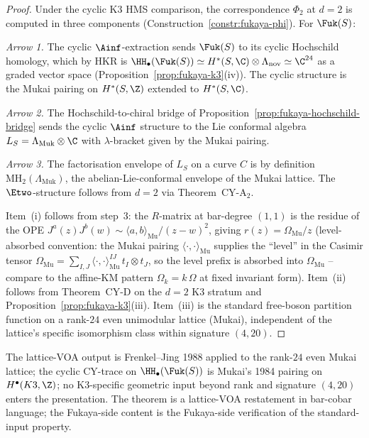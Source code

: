 \begin{proof}
Under the cyclic K3 HMS comparison, the correspondence $\Phi_2$ at
$d = 2$ is computed in three components
(Construction~\ref{constr:fukaya-phi}). For $\Fuk(S)$:

\emph{Arrow 1.} The cyclic $\Ainf$-extraction sends $\Fuk(S)$ to
its cyclic Hochschild homology, which by HKR is
$\HH_\bullet(\Fuk(S)) \simeq H^*(S, \C) \otimes
\Lambda_{\mathrm{nov}} \simeq \C^{24}$ as a graded vector space
(Proposition~\ref{prop:fukaya-k3}(iv)). The cyclic structure is
the Mukai pairing on $H^*(S, \Z)$ extended to $H^*(S, \C)$.

\emph{Arrow 2.} The Hochschild-to-chiral bridge of
Proposition~\ref{prop:fukaya-hochschild-bridge} sends the cyclic
$\Ainf$ structure to the Lie conformal algebra
$L_S = \Lambda_{\mathrm{Muk}} \otimes \C$ with $\lambda$-bracket given by
the Mukai pairing.

\emph{Arrow 3.} The factorisation envelope of $L_S$ on a curve $C$
is by definition $\mathrm{MH}_2(\Lambda_{\mathrm{Muk}})$, the
abelian-Lie-conformal envelope of the Mukai lattice. The
$\Etwo$-structure follows from $d = 2$ via Theorem~CY-A$_2$.

Item~(i) follows from step~3: the $R$-matrix at bar-degree $(1,1)$
is the residue of the OPE $J^a(z) J^b(w) \sim \langle a, b \rangle_{\mathrm{Mu}} / (z-w)^2$,
giving $r(z) = \Omega_{\mathrm{Mu}}/z$ (level-absorbed convention: the
Mukai pairing $\langle\cdot,\cdot\rangle_{\mathrm{Mu}}$ supplies the
``level'' in the Casimir tensor $\Omega_{\mathrm{Mu}} =
\sum_{I,J} \langle \cdot, \cdot \rangle_{\mathrm{Mu}}^{IJ}\,t_I \otimes t_J$,
so the level prefix is absorbed into $\Omega_{\mathrm{Mu}}$ -- compare
to the affine-KM pattern $\Omega_k = k\,\Omega$ at fixed invariant
form). Item~(ii) follows from Theorem~CY-D on the $d=2$ K3 stratum
and Proposition~\ref{prop:fukaya-k3}(iii). Item~(iii) is the standard
free-boson partition function on a rank-$24$ even unimodular
lattice (Mukai), independent of the lattice's specific isomorphism
class within signature $(4, 20)$.
\end{proof}

\begin{remark}
\label{rem:fukaya-k3-classical-attribution}
The lattice-VOA output is Frenkel--Jing 1988 applied to the
rank-$24$ even Mukai lattice; the cyclic CY-trace on
$\HH_\bullet(\Fuk(S))$ is Mukai's 1984 pairing on
$H^\bullet(K3, \Z)$; no K3-specific geometric input beyond rank
and signature $(4, 20)$ enters the presentation. The
theorem is a lattice-VOA restatement in bar-cobar language; the
Fukaya-side content is the Fukaya-side verification of the
standard-input property.
\end{remark}


